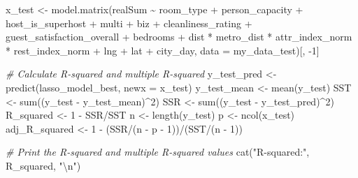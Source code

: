 \documentclass[
]{article}
\newenvironment{Shaded}{\begin{snugshade}}{\end{snugshade}}
\newcommand{\AttributeTok}[1]{\textcolor[rgb]{0.77,0.63,0.00}{#1}}
\newcommand{\CommentTok}[1]{\textcolor[rgb]{0.56,0.35,0.01}{\textit{#1}}}
\newcommand{\DecValTok}[1]{\textcolor[rgb]{0.00,0.00,0.81}{#1}}
\newcommand{\FunctionTok}[1]{\textcolor[rgb]{0.00,0.00,0.00}{#1}}
\newcommand{\NormalTok}[1]{#1}
\newcommand{\OtherTok}[1]{\textcolor[rgb]{0.56,0.35,0.01}{#1}}
\newcommand{\SpecialCharTok}[1]{\textcolor[rgb]{0.00,0.00,0.00}{#1}}
\newcommand{\StringTok}[1]{\textcolor[rgb]{0.31,0.60,0.02}{#1}}
\begin{document}
\begin{Shaded}
\begin{Highlighting}[]
\NormalTok{x\_test }\OtherTok{\textless{}{-}} \FunctionTok{model.matrix}\NormalTok{(realSum }\SpecialCharTok{\textasciitilde{}}\NormalTok{ room\_type }\SpecialCharTok{+}\NormalTok{ person\_capacity }\SpecialCharTok{+}
\NormalTok{    host\_is\_superhost }\SpecialCharTok{+}\NormalTok{ multi }\SpecialCharTok{+}\NormalTok{ biz }\SpecialCharTok{+}\NormalTok{ cleanliness\_rating }\SpecialCharTok{+}\NormalTok{ guest\_satisfaction\_overall }\SpecialCharTok{+}
\NormalTok{    bedrooms }\SpecialCharTok{+}\NormalTok{ dist }\SpecialCharTok{*}\NormalTok{ metro\_dist }\SpecialCharTok{*}\NormalTok{ attr\_index\_norm }\SpecialCharTok{*}\NormalTok{ rest\_index\_norm }\SpecialCharTok{+}
\NormalTok{    lng }\SpecialCharTok{+}\NormalTok{ lat }\SpecialCharTok{+}\NormalTok{ city\_day, }\AttributeTok{data =}\NormalTok{ my\_data\_test)[, }\SpecialCharTok{{-}}\DecValTok{1}\NormalTok{]}

\CommentTok{\# Calculate R{-}squared and multiple R{-}squared}
\NormalTok{y\_test\_pred }\OtherTok{\textless{}{-}} \FunctionTok{predict}\NormalTok{(lasso\_model\_best, }\AttributeTok{newx =}\NormalTok{ x\_test)}
\NormalTok{y\_test\_mean }\OtherTok{\textless{}{-}} \FunctionTok{mean}\NormalTok{(y\_test)}
\NormalTok{SST }\OtherTok{\textless{}{-}} \FunctionTok{sum}\NormalTok{((y\_test }\SpecialCharTok{{-}}\NormalTok{ y\_test\_mean)}\SpecialCharTok{\^{}}\DecValTok{2}\NormalTok{)}
\NormalTok{SSR }\OtherTok{\textless{}{-}} \FunctionTok{sum}\NormalTok{((y\_test }\SpecialCharTok{{-}}\NormalTok{ y\_test\_pred)}\SpecialCharTok{\^{}}\DecValTok{2}\NormalTok{)}
\NormalTok{R\_squared }\OtherTok{\textless{}{-}} \DecValTok{1} \SpecialCharTok{{-}}\NormalTok{ SSR}\SpecialCharTok{/}\NormalTok{SST}
\NormalTok{n }\OtherTok{\textless{}{-}} \FunctionTok{length}\NormalTok{(y\_test)}
\NormalTok{p }\OtherTok{\textless{}{-}} \FunctionTok{ncol}\NormalTok{(x\_test)}
\NormalTok{adj\_R\_squared }\OtherTok{\textless{}{-}} \DecValTok{1} \SpecialCharTok{{-}}\NormalTok{ (SSR}\SpecialCharTok{/}\NormalTok{(n }\SpecialCharTok{{-}}\NormalTok{ p }\SpecialCharTok{{-}} \DecValTok{1}\NormalTok{))}\SpecialCharTok{/}\NormalTok{(SST}\SpecialCharTok{/}\NormalTok{(n }\SpecialCharTok{{-}} \DecValTok{1}\NormalTok{))}


\CommentTok{\# Print the R{-}squared and multiple R{-}squared values}
\FunctionTok{cat}\NormalTok{(}\StringTok{"R{-}squared:"}\NormalTok{, R\_squared, }\StringTok{"}\SpecialCharTok{\textbackslash{}n}\StringTok{"}\NormalTok{)}
\end{Highlighting}
\end{Shaded}
\end{document}
